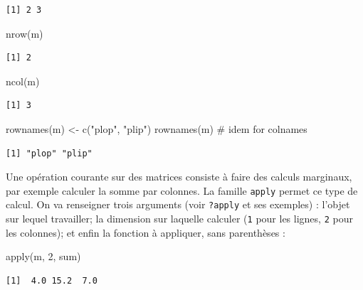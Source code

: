 \documentclass[
  letterpaper,
  DIV=11,
  numbers=noendperiod]{scrreprt}
\newenvironment{Shaded}{\begin{snugshade}}{\end{snugshade}}
\newcommand{\CommentTok}[1]{\textcolor[rgb]{0.37,0.37,0.37}{#1}}
\newcommand{\DecValTok}[1]{\textcolor[rgb]{0.68,0.00,0.00}{#1}}
\newcommand{\FunctionTok}[1]{\textcolor[rgb]{0.28,0.35,0.67}{#1}}
\newcommand{\NormalTok}[1]{\textcolor[rgb]{0.00,0.23,0.31}{#1}}
\newcommand{\OtherTok}[1]{\textcolor[rgb]{0.00,0.23,0.31}{#1}}
\newcommand{\StringTok}[1]{\textcolor[rgb]{0.13,0.47,0.30}{#1}}
\begin{document}
\begin{verbatim}
[1] 2 3
\end{verbatim}

\begin{Shaded}
\begin{Highlighting}[]
\FunctionTok{nrow}\NormalTok{(m)}
\end{Highlighting}
\end{Shaded}

\begin{verbatim}
[1] 2
\end{verbatim}

\begin{Shaded}
\begin{Highlighting}[]
\FunctionTok{ncol}\NormalTok{(m)}
\end{Highlighting}
\end{Shaded}

\begin{verbatim}
[1] 3
\end{verbatim}

\begin{Shaded}
\begin{Highlighting}[]
\FunctionTok{rownames}\NormalTok{(m) }\OtherTok{\textless{}{-}} \FunctionTok{c}\NormalTok{(}\StringTok{"plop"}\NormalTok{, }\StringTok{"plip"}\NormalTok{)}
\FunctionTok{rownames}\NormalTok{(m) }\CommentTok{\# idem for colnames}
\end{Highlighting}
\end{Shaded}

\begin{verbatim}
[1] "plop" "plip"
\end{verbatim}

Une opération courante sur des matrices consiste à faire des calculs
marginaux, par exemple calculer la somme par colonnes. La famille
\texttt{apply} permet ce type de calcul. On va renseigner trois
arguments (voir \texttt{?apply} et ses exemples) : l'objet sur lequel
travailler; la dimension sur laquelle calculer (\texttt{1} pour les
lignes, \texttt{2} pour les colonnes); et enfin la fonction à appliquer,
sans parenthèses :

\begin{Shaded}
\begin{Highlighting}[]
\FunctionTok{apply}\NormalTok{(m, }\DecValTok{2}\NormalTok{, sum)}
\end{Highlighting}
\end{Shaded}

\begin{verbatim}
[1]  4.0 15.2  7.0
\end{verbatim}
\end{document}
